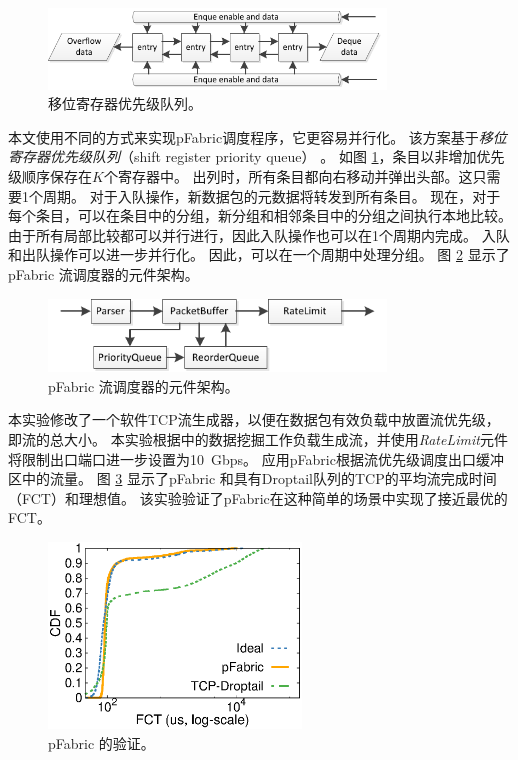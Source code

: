 \begin{figure}[htbp]
	\centering
	\includegraphics[width=0.8\textwidth]{image/PriorityQueue}
	\caption{移位寄存器优先级队列。}
	\label{clicknp:fig:ShiftRegPrioQueue}
\end{figure}


本文使用不同的方式来实现pFabric调度程序，它更容易并行化。
该方案基于\textit{移位寄存器优先级队列}（shift register priority queue） \cite {moon2000scalable}。
如图 \ref{clicknp:fig:ShiftRegPrioQueue}，条目以非增加优先级顺序保存在$K$个寄存器中。
出列时，所有条目都向右移动并弹出头部。这只需要1个周期。
对于入队操作，新数据包的元数据将转发到所有条目。
现在，对于每个条目，可以在条目中的分组，新分组和相邻条目中的分组之间执行本地比较。
由于所有局部比较都可以并行进行，因此入队操作也可以在1个周期内完成。
入队和出队操作可以进一步并行化。
因此，可以在一个周期中处理分组。
图 \ref{clicknp:fig:pfabric-arch} 显示了 pFabric 流调度器的元件架构。


\begin{figure}[htbp]
	\centering
	\includegraphics[width=0.8\textwidth]{image/PFabric}
	\caption{pFabric 流调度器的元件架构。}
	\label{clicknp:fig:pfabric-arch}
\end{figure}

本实验修改了一个软件TCP流生成器\cite {mqecn}，以便在数据包有效负载中放置流优先级，即流的总大小。
本实验根据\cite {pfabric}中的数据挖掘工作负载生成流，并使用\textit {RateLimit}元件将限制出口端口进一步设置为10~Gbps。
应用pFabric根据流优先级调度出口缓冲区中的流量。
图 \ref{clicknp:fig:pfabric} 显示了pFabric 和具有Droptail队列的TCP的平均流完成时间（FCT）和理想值。
该实验验证了pFabric在这种简单的场景中实现了接近最优的FCT。

\begin{figure}[htbp]
	\centering
	\includegraphics[width=0.6\textwidth]{eval/pfabric}
	\caption{pFabric 的验证。}
	\label{clicknp:fig:pfabric}
\end{figure}

